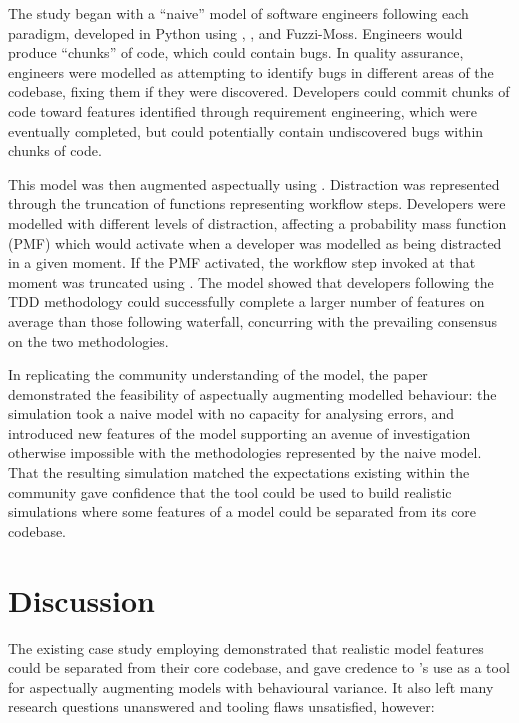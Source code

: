 The study began with a ``naive'' model of software engineers following each
paradigm, developed in Python using \pydysofu{}, \theatreag{}, and Fuzzi-Moss.
Engineers would produce ``chunks'' of code, which could contain bugs. In quality
assurance, engineers were modelled as attempting to identify bugs in different
areas of the codebase, fixing them if they were discovered. Developers could
commit chunks of code toward features identified through requirement
engineering, which were eventually completed, but could potentially contain
undiscovered bugs within chunks of code.

This model was then augmented aspectually using \pydysofu{}. Distraction was
represented through the truncation of functions representing workflow steps.
Developers were modelled with different levels of distraction, affecting a
probability mass function (PMF) which would activate when a developer was
modelled as being distracted in a given moment. If the PMF activated, the
workflow step invoked at that moment was truncated using \pydysofu{}. The model showed
that developers following the TDD methodology could successfully complete a
larger number of features on average than those following waterfall, concurring
with the prevailing consensus on the two methodologies. 

In replicating the community understanding of the model, the paper demonstrated
the feasibility of aspectually augmenting modelled behaviour: the simulation
took a naive model with no capacity for analysing errors, and introduced new
features of the model supporting an avenue of investigation otherwise
impossible with the methodologies represented by the naive model. That the
resulting simulation matched the expectations existing within the community gave
confidence that the tool could be used to build realistic simulations where
some features of a model could be separated from its core codebase.


\section{Discussion}\label{sec:prior_work_discussion}

The existing case study employing \pydysofu demonstrated that realistic model
features could be separated from their core codebase, and gave credence to
\pydysofu{}'s use as a tool for aspectually augmenting models with behavioural
variance. It also left many research questions unanswered and tooling
flaws unsatisfied, however:

